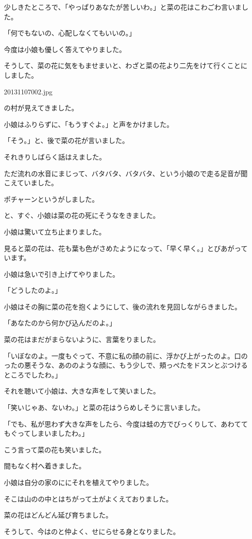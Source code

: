 少しきたところで、「やっぱりあなたが苦しいわ。」と菜の花はこわごわ言いました。

「何でもないの、心配しなくてもいいの。」

今度は小娘も優しく答えてやりました。

そうして、菜の花に気をもませまいと、わざと菜の花より二先をけて行くことにしました。



20131107002.jpg



の村が見えてきました。

小娘はふりらずに、「もうすぐよ。」と声をかけました。

「そう。」と、後で菜の花が言いました。

それきりしばらく話はえました。

ただ流れの水音にまじって、バタバタ、バタバタ、という小娘ので走る足音が聞こえていました。

ポチャーンというがしました。

と、すぐ、小娘は菜の花の死にそうなをきました。

小娘は驚いて立ち止まりました。

見ると菜の花は、花も葉も色がさめたようになって、「早く早く。」とびあがっています。

小娘は急いで引き上げてやりました。

「どうしたのよ。」

小娘はその胸に菜の花を抱くようにして、後の流れを見回しながらきました。

「あなたのから何かび込んだのよ。」

菜の花はまだがまらないように、言葉をりました。

「いぼなのよ。一度もぐって、不意に私の顔の前に、浮かび上がったのよ。口のったの悪そうな、あののような顔に、もう少しで、頬っぺたをドスンとぶつけるところでしたわ。」

それを聴いて小娘は、大きな声をして笑いました。

「笑いじゃあ、ないわ。」と菜の花はうらめしそうに言いました。

「でも、私が思わず大きな声をしたら、今度は蛙の方でびっくりして、あわててもぐってしまいましたわ。」

こう言って菜の花も笑いました。



間もなく村へ着きました。

小娘は自分の家のににそれを植えてやりました。

そこは山のの中とはちがって土がよくえておりました。

菜の花はどんどん延び育ちました。

そうして、今はのと仲よく、せにらせる身となりました。

